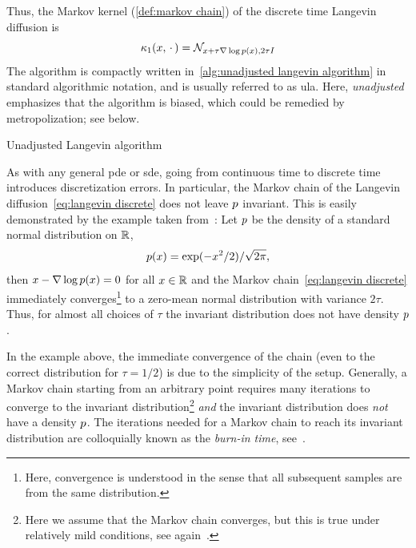 Thus, the Markov kernel (\cref{def:markov chain}) of the discrete time Langevin diffusion is
\begin{equation}
	\kappa_{\num{1}}(x, \,\cdot\,) = \mathcal{N}_{x + \tau\nabla\log p(x), \num{2}\tau I}
\end{equation}
The algorithm is compactly written in~\cref{alg:unadjusted langevin algorithm} in standard algorithmic notation, and is usually referred to as \gls{ula}.
Here, \emph{unadjusted} emphasizes that the algorithm is biased, which could be remedied by metropolization; see below.
\begin{algorithm}
	\DontPrintSemicolon
	\caption{Unadjusted Langevin algorithm}%
	\label{alg:unadjusted langevin algorithm}
\end{algorithm}

As with any general \gls{pde} or \gls{sde}, going from continuous time to discrete time introduces discretization errors.
In particular, the Markov chain of the Langevin diffusion~\cref{eq:langevin discrete} does not leave \( p \) invariant.
This is easily demonstrated by the example taken from~\cite{roberts_exponential_1996}:
Let \( p \) be the density of a standard normal distribution on \( \mathbb{R} \),
\begin{equation}
	p(x) =  \exp(-x^{\num{2}}/\num{2}) / \sqrt{\num{2}\pi},
\end{equation}
then \( x - \nabla \log p(x) = \num{0} \) for all \( x \in \mathbb{R} \) and the Markov chain~\cref{eq:langevin discrete} immediately converges\footnote{Here, convergence is understood in the sense that all subsequent samples are from the same distribution.} to a zero-mean normal distribution with variance \( \num{2}\tau \).
Thus, for almost all choices of \( \tau \) the invariant distribution does not have density \( p \).

In the example above, the immediate convergence of the chain (even to the correct distribution for \( \tau = \num{1}/\num{2} \)) is due to the simplicity of the setup.
Generally, a Markov chain starting from an arbitrary point requires many iterations to converge to the invariant distribution\footnote{Here we assume that the Markov chain converges, but this is true under relatively mild conditions, see again~\cite[theorem \num{6.1}]{meyn_stability_1993}.} \emph{and} the invariant distribution does \emph{not} have a density \( p \).
The iterations needed for a Markov chain to reach its invariant distribution are colloquially known as the \emph{burn-in time}, see~\cite[section \num{1.11}]{Brooks2011}.

